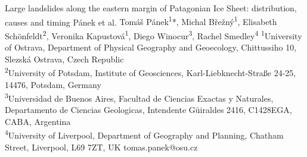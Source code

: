 \abstract
{Large landslides along the eastern margin of Patagonian Ice Sheet: distribution, causes and timing} %
{Pánek et al.} %
{Tomáš Pánek\textsuperscript{1}*, Michal Břežný\textsuperscript{1}, Elisabeth Schönfeldt\textsuperscript{2}, Veronika Kapustová\textsuperscript{1}, Diego Winocur\textsuperscript{3}, Rachel Smedley\textsuperscript{4}} %
{\TLtag} %
{\textsuperscript{1}University of Ostrava, Department of Physical Geography and Geoecology, Chittussiho 10, Slezská Ostrava, Czech Republic \\
\textsuperscript{2}University of Potsdam, Institute of Geosciences, Karl-Liebknecht-Straße 24-25, 14476, Potsdam, Germany \\
\textsuperscript{3}Universidad de Buenos Aires, Facultad de Ciencias Exactas y Naturales, Departamento de Ciencias Geologicas, Intendente Güiraldes 2416, C1428EGA, CABA, Argentina \\
\textsuperscript{4}University of Liverpool, Department of Geography and Planning, Chatham Street, Liverpool, L69 7ZT, UK} %
{tomas.panek@osu.cz}  %
{}%
